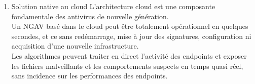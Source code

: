 \begin{enumerate}
 \item Solution native au cloud
 L’architecture cloud est une composante fondamentale des antivirus de nouvelle génération.\\
  Un NGAV basé dans le cloud peut être totalement opérationnel en quelques secondes, et ce sans redémarrage, mise à jour des signatures, configuration ni acquisition d’une nouvelle infrastructure.\\
   Les algorithmes peuvent traiter en direct l’activité des endpoints et exposer les fichiers malveillants et les comportements suspects en temps quasi réel, sans incidence sur les performances des endpoints.\\
\end{enumerate}


